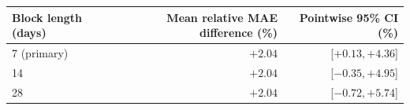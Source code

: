 \begin{tabular}{lrr}
\toprule
Block length (days) & Mean relative MAE difference (\%) & Pointwise 95\% CI (\%)\\
\midrule
7 (primary) & $+2.04$ & [$+0.13, +4.36$]\\
14 & $+2.04$ & [$-0.35, +4.95$]\\
28 & $+2.04$ & [$-0.72, +5.74$]\\
\bottomrule
\end{tabular}

